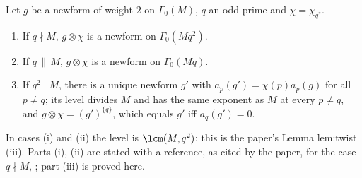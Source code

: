 \begin{theorem}\label{thm:hecke:atkin-li}
Let $g$ be a newform of weight $2$ on $\Gamma_0(M)$, $q$ an odd prime and $\chi=\chi_{q^*}$.
\begin{enumerate}[label=(\roman*)]
\item If $q\nmid M$, $g\otimes\chi$ is a newform on $\Gamma_0(Mq^2)$.
\item If $q\,\|\,M$, $g\otimes\chi$ is a newform on $\Gamma_0(Mq)$.
\item If $q^2\mid M$, there is a unique newform $g'$ with $a_p(g')=\chi(p)a_p(g)$ for all $p\ne q$; its level divides $M$ and has the same exponent as $M$ at every $p\ne q$, and
$g\otimes\chi=(g')^{\{q\}}$, which equals $g'$ iff $a_q(g')=0$.
\end{enumerate}
In cases (i) and (ii) the level is $\lcm(M,q^2)$: this is the paper's Lemma lem:twist (iii). Parts (i), (ii) are stated with a reference, \cite[Theorem 3.1]{AtkinLi78} as cited by the
paper, \cite{Li75} for the case $q\nmid M$, \cite[Section 3.6]{Shimura71}; part (iii) is proved here.
\end{theorem}

